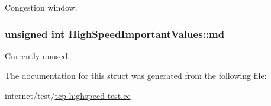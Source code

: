 Congestion window. 

\subsubsection[{\texorpdfstring{md}{md}}]{\setlength{\rightskip}{0pt plus 5cm}unsigned int High\+Speed\+Important\+Values\+::md}\hypertarget{structHighSpeedImportantValues_ae071f088a04aed6c82e935bf2dcf2bab}{}\label{structHighSpeedImportantValues_ae071f088a04aed6c82e935bf2dcf2bab}


Currently unused. 



The documentation for this struct was generated from the following file\+:\begin{DoxyCompactItemize}
\item 
internet/test/\hyperlink{tcp-highspeed-test_8cc}{tcp-\/highspeed-\/test.\+cc}\end{DoxyCompactItemize}

